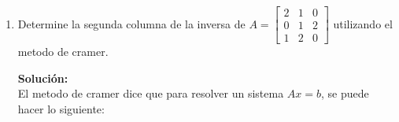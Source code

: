 \documentclass[12pt]{article}
\newenvironment{solucion}
{\begin{mdframed}[backgroundcolor=black!10]
		{\bf Solución:}\\
	}
	{
	\end{mdframed}
}
\newenvironment{preguntas}
{\begin{enumerate}\itemsep12pt
	}
	{
	\end{enumerate}
}
\begin{document}
\begin{preguntas}
\begin{solucion}
\begin{enumerate}[a)]
$$\begin{pmatrix}
			\end{pmatrix}$$
			Por lo que
			$$A_T = \begin{bmatrix}
			1 & 1 & 0 \\
			0 & 1 & 1 \\
			1 & 0 & -1 
			\end{bmatrix}$$
			Luego, el volumen de $T(P)$ será $|det(A_P)| \cdot |det(A_T)|$
			$$|det(A_T)| = \left| det \left(\begin{bmatrix}
			1 & 1 & 0 \\
			0 & 1 & 1 \\
			1 & 0 & -1 
			\end{bmatrix}\right)\right| = |1(-1-0) - (0 - 1)| = |1-1| = 0$$
			Finalmente,
			$$V(T(P)) = |det(A_P)| \cdot |det(A_T)| = 15 \cdot 0 = 0$$
\end{enumerate}
\end{solucion}
\item Determine la segunda columna de la inversa de $A = \left[ \begin{array}{rrr} 2&1&0\\ 0&1&2\\ 1&2&0 \end{array} \right]$ utilizando el metodo de cramer.
\begin{solucion}
El metodo de cramer dice que para resolver un sistema $Ax = b$, se puede hacer lo siguiente:\\


\end{solucion}
\end{preguntas}
\end{document}
